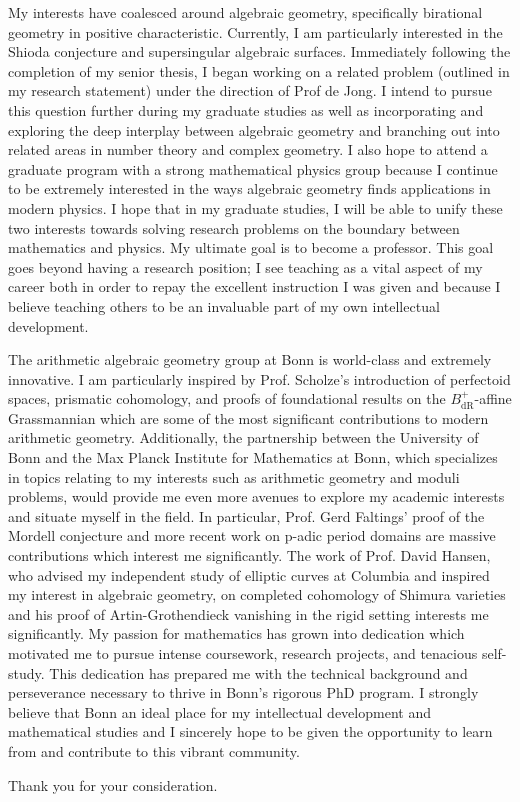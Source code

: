 \documentclass[11pt]{amsart}
\begin{document}
My interests have coalesced around algebraic geometry, specifically birational geometry in positive characteristic. Currently, I am particularly interested in the Shioda conjecture and supersingular algebraic surfaces. Immediately following the completion of my senior thesis, I began working on a related problem (outlined in my research statement) under the direction of Prof de Jong. I intend to pursue this question further during my graduate studies as well as incorporating and exploring the deep interplay between algebraic geometry and branching out into related areas in number theory and complex geometry. I also hope to attend a graduate program with a strong mathematical physics group because I continue to be extremely interested in the ways algebraic geometry finds applications in modern physics. I hope that in my graduate studies, I will be able to unify these two interests towards solving research problems on the boundary between mathematics and physics. My ultimate goal is to become a professor. This goal goes beyond having a research position; I see teaching as a vital aspect of my career both in order to repay the excellent instruction I was given and because I believe teaching others to be an invaluable part of my own intellectual development.

The arithmetic algebraic geometry group at Bonn is world-class and extremely innovative. I am particularly inspired by Prof. Scholze’s introduction of perfectoid spaces, prismatic cohomology, and proofs of foundational results on the $B_{\mathrm{dR}}^+$-affine Grassmannian which are some of the most significant contributions to modern arithmetic geometry. Additionally, the partnership between the University of Bonn and the Max Planck Institute for Mathematics at Bonn, which specializes in topics relating to my interests such as arithmetic geometry and moduli problems, would provide me even more avenues to explore my academic interests and situate myself in the field. In particular, Prof. Gerd Faltings’ proof of the Mordell conjecture and more recent work on p-adic period domains are massive contributions which interest me significantly. The work of Prof. David Hansen, who advised my independent study of elliptic curves at Columbia and inspired my interest in algebraic geometry, on completed cohomology of Shimura varieties and his proof of Artin-Grothendieck vanishing in the rigid setting interests me significantly. My passion for mathematics has grown into dedication which motivated me to pursue intense coursework, research projects, and tenacious self-study. This dedication has prepared me with the technical background and perseverance necessary to thrive in Bonn’s rigorous PhD program. I strongly believe that Bonn an ideal place for my intellectual development and mathematical studies and I sincerely hope to be given the opportunity to learn from and contribute to this vibrant community.  

Thank you for your consideration. 




\end{document}
